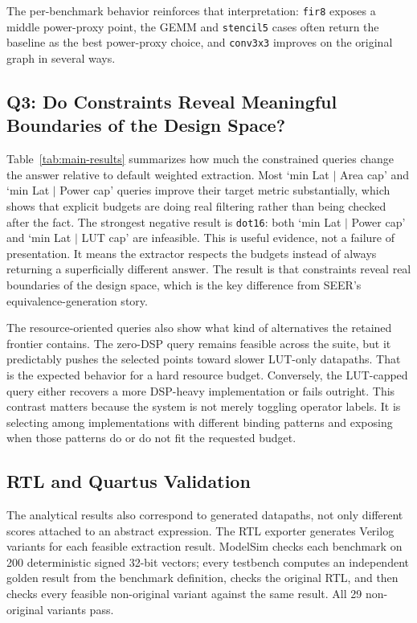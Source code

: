 \documentclass[sigplan,10pt,review]{acmart}
\begin{document}
The per-benchmark behavior reinforces that interpretation: \texttt{fir8} exposes a middle power-proxy point, the GEMM and \texttt{stencil5} cases often return the baseline as the best power-proxy choice, and \texttt{conv3x3} improves on the original graph in several ways.

\subsection{Q3: Do Constraints Reveal Meaningful Boundaries of the Design Space?}
Table~\ref{tab:main-results} summarizes how much the constrained queries change the answer relative to default weighted extraction. Most `min Lat $|$ Area cap' and `min Lat $|$ Power cap' queries improve their target metric substantially, which shows that explicit budgets are doing real filtering rather than being checked after the fact. The strongest negative result is \texttt{dot16}: both `min Lat $|$ Power cap' and `min Lat $|$ LUT cap' are infeasible. This is useful evidence, not a failure of presentation. It means the extractor respects the budgets instead of always returning a superficially different answer. The result is that constraints reveal real boundaries of the design space, which is the key difference from SEER's equivalence-generation story.

The resource-oriented queries also show what kind of alternatives the retained frontier contains. The zero-DSP query remains feasible across the suite, but it predictably pushes the selected points toward slower LUT-only datapaths. That is the expected behavior for a hard resource budget. Conversely, the LUT-capped query either recovers a more DSP-heavy implementation or fails outright. This contrast matters because the system is not merely toggling operator labels. It is selecting among implementations with different binding patterns and exposing when those patterns do or do not fit the requested budget.

\subsection{RTL and Quartus Validation}
The analytical results also correspond to generated datapaths, not only different scores attached to an abstract expression. The RTL exporter generates Verilog variants for each feasible extraction result. ModelSim checks each benchmark on 200 deterministic signed 32-bit vectors; every testbench computes an independent golden result from the benchmark definition, checks the original RTL, and then checks every feasible non-original variant against the same result. All 29 non-original variants pass.
\end{document}
